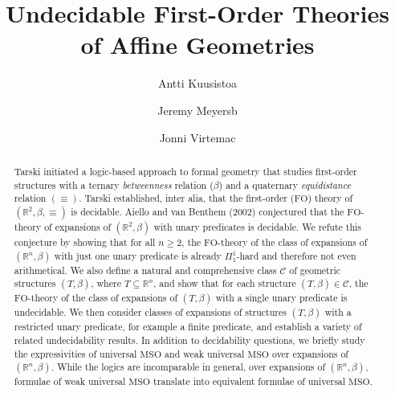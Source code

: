 \documentclass{LMCS}
\theoremstyle{plain}
\newcommand{\rp}{(\mathbb{R}^n,\beta)}
\newcommand{\rsq}{\mathbb{R}^n}
\begin{document}
\title[Undecidable First-Order Theories of Affine Geometries]{Undecidable First-Order Theories of Affine Geometries\rsuper*}

\author[A.~Kuusisto]{Antti Kuusisto\rsuper a}	%
\address{{\lsuper a}University of Wroc\l aw}	%

\author[J.~Meyers]{Jeremy Meyers\rsuper b}	%
\address{{\lsuper b}Stanford University}	%

\author[J.~Virtema]{Jonni Virtema\rsuper c}	%
\address{{\lsuper c}University of Tampere}	%


\begin{abstract}
Tarski initiated a logic-based approach to formal geometry that studies
first-order structures with a ternary \emph{betweenness} relation ($\beta$) and a quaternary
\emph{equidistance} relation $(\equiv)$. Tarski established, inter alia, that
the first-order ($\mathrm{FO}$) theory of $(\mathbb{R}^2,\beta,\equiv)$ is decidable.
Aiello and van Benthem (2002) conjectured that the $\mathrm{FO}$-theory of expansions of $(\mathbb{R}^2,\beta)$ with unary predicates
is decidable. We refute this conjecture by showing that for all $n\geq 2$, the $\mathrm{FO}$-theory of the class of expansions of $\rp$ with just one unary predicate is already $\Pi_1^1$-hard
and therefore not even arithmetical.
We also define a natural and comprehensive class $\mathcal{C}$ of geometric structures $(T,\beta)$, where $T\subseteq \rsq$, and show that
for each structure $(T,\beta)\in\mathcal{C}$, the $\mathrm{FO}$-theory of the class of expansions of $(T,\beta)$ with
%
a single unary predicate is undecidable.
We then consider classes of expansions of structures $(T,\beta)$ with a restricted unary 
predicate, for example a finite predicate, 
and establish a variety of related undecidability results.
In addition to decidability questions, we
briefly study the expressivities of universal $\mathrm{MSO}$ and weak universal $\mathrm{MSO}$ over
expansions of $(\mathbb{R}^n,\beta)$.
While the logics are incomparable in general, over expansions of $(\mathbb{R}^n,\beta)$, formulae of weak universal $\mathrm{MSO}$
translate into equivalent formulae of universal $\mathrm{MSO}$.
\end{abstract}
\end{document}
